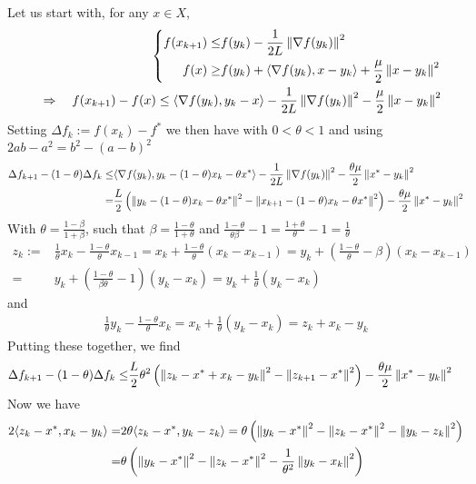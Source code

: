 \documentclass[12pt,english]{article}
\begin{document}
Let us start with, for any $x\in X$,
%
%
\begin{align*}
%
\left\{
\begin{aligned}
f(x_{k+1}) \le&   f(y_k)  -\frac{1}{2L}\norm{\nabla f(y_k)}^2\\
f(x) \ge& f(y_k) + \scp{\nabla f(y_k)}{x-y_k} + \frac{\mu}{2}\norm{x-y_k}^2
\end{aligned}
\right.\\
\quad\Rightarrow\quad 
f(x_{k+1})-f(x)\le \scp{\nabla f(y_k)}{y_k-x} -\frac{1}{2L}\norm{\nabla f(y_k)}^2  -\frac{\mu}{2}\norm{x-y_k}^2
%
\end{align*}
%
Setting $\Delta f_k:= f(x_k)-f^*$ we then have with $0<\theta<1$ and using $2ab -a^2 = b^2-(a-b)^2$
%
\begin{align*}
\Delta f_{k+1} -(1-\theta)\Delta f_k \le& \langle\nabla f(y_k),y_k-(1-\theta)x_k -\theta x^*\rangle -\frac{1}{2L}\left\|\nabla f(y_k)\right\|^2  -\frac{\theta\mu}{2}\left\|x^*-y_k\right\|^2\\
=& \frac{L}{2}\left( \left\|y_k-(1-\theta)x_k -\theta x^*\right\|^2 - \left\|x_{k+1}-(1-\theta)x_k -\theta x^*\right\|^2\right) -\frac{\theta\mu}{2}\left\|x^*-y_k\right\|^2
\end{align*}
%
With $\theta=\frac{1-\beta}{1+\beta}$, such that $\beta=\frac{1-\theta}{1+\theta}$ and 
$\frac{1-\theta}{\theta\beta}-1  = \frac{1+\theta}{\theta}-1 = \frac{1}{\theta}$
%
\begin{align*}
z_k :=& \frac{1}{\theta}x_k - \frac{1-\theta}{\theta} x_{k-1} = x_k  + \frac{1-\theta}{\theta} (x_k-x_{k-1})
= y_k + \left(  \frac{1-\theta}{\theta}-\beta\right) (x_k-x_{k-1})\\ 
=& y_k + \left(\frac{1-\theta}{\beta\theta}-1\right)(y_k-x_k)
= y_k + \frac{1}{\theta}(y_k-x_k)
\end{align*}
%
and
%
\begin{align*}
\frac{1}{\theta}y_k - \frac{1-\theta}{\theta} x_{k} = x_k +\frac{1}{\theta}(y_k-x_k)=  z_k + x_k-y_k
\end{align*}
%
Putting these together, we find
%
\begin{align*}
\Delta f_{k+1} -(1-\theta)\Delta f_k \le& \frac{L}{2}\theta^2\left( \left\|z_k- x^* + x_k-y_k\right\|^2 - \left\|z_{k+1} - x^*\right\|^2\right) -\frac{\theta\mu}{2}\left\|x^*-y_k\right\|^2
\end{align*}
%
Now we have 
%
\begin{align*}
2\langle z_k- x^*, x_k-y_k\rangle =& 2\theta\langle z_k- x^*, y_k-z_k\rangle = \theta\left( \left\|y_k- x^*\right\|^2 - \left\|z_k-x^*\right\|^2 - \left\|y_k- z_k\right\|^2 \right)\\
=&\theta\left( \left\|y_k- x^*\right\|^2 - \left\|z_k-x^*\right\|^2 - \frac{1}{\theta^2}\left\|y_k- x_k\right\|^2 \right)
\end{align*}
\end{document}
